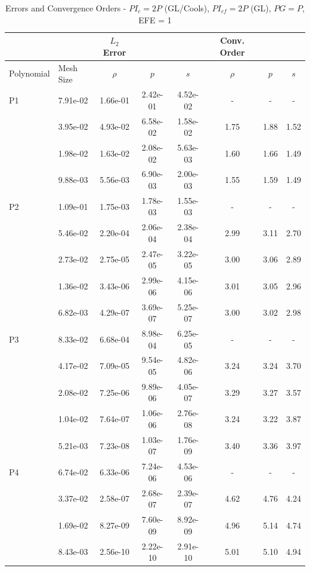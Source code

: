 \documentclass[12pt,Bold,letterpaper,TexShade]{mcgilletdclass}
\numberwithin{equation}{section}
\begin{document}
\begin {table}[!htbp]
\begin{center}
\caption{Errors and Convergence Orders - $PI_c  = 2P$ (GL/Cools), $PI_{cf} = 2P$ (GL), $PG = P$, EFE = 1}
\begin{tabular}{| l | l | c c c | c c c |}
	\hline
	 & & $L_2$ Error & & & Conv. Order & & \\
	\hline
	Polynomial & Mesh Size & $\rho$ & $p$     & $s$     & $\rho$ & $p$     & $s$     \\
	\hline
P1	& 7.91e-02 & 1.66e-01 & 2.42e-01 & 4.52e-02 & - & - & - \\
	& 3.95e-02 & 4.93e-02 & 6.58e-02 & 1.58e-02 & 1.75 & 1.88 & 1.52 \\
	& 1.98e-02 & 1.63e-02 & 2.08e-02 & 5.63e-03 & 1.60 & 1.66 & 1.49 \\
	& 9.88e-03 & 5.56e-03 & 6.90e-03 & 2.00e-03 & 1.55 & 1.59 & 1.49 \\
	\hline
P2	& 1.09e-01 & 1.75e-03 & 1.78e-03 & 1.55e-03 & - & - & - \\
	& 5.46e-02 & 2.20e-04 & 2.06e-04 & 2.38e-04 & 2.99 & 3.11 & 2.70 \\
	& 2.73e-02 & 2.75e-05 & 2.47e-05 & 3.22e-05 & 3.00 & 3.06 & 2.89 \\
	& 1.36e-02 & 3.43e-06 & 2.99e-06 & 4.15e-06 & 3.01 & 3.05 & 2.96 \\
	& 6.82e-03 & 4.29e-07 & 3.69e-07 & 5.25e-07 & 3.00 & 3.02 & 2.98 \\
	\hline
P3	& 8.33e-02 & 6.68e-04 & 8.98e-04 & 6.25e-05 & - & - & - \\
	& 4.17e-02 & 7.09e-05 & 9.54e-05 & 4.82e-06 & 3.24 & 3.24 & 3.70 \\
	& 2.08e-02 & 7.25e-06 & 9.89e-06 & 4.05e-07 & 3.29 & 3.27 & 3.57 \\
	& 1.04e-02 & 7.64e-07 & 1.06e-06 & 2.76e-08 & 3.24 & 3.22 & 3.87 \\
	& 5.21e-03 & 7.23e-08 & 1.03e-07 & 1.76e-09 & 3.40 & 3.36 & 3.97 \\
	\hline
P4	& 6.74e-02 & 6.33e-06 & 7.24e-06 & 4.53e-06 & - & - & - \\
	& 3.37e-02 & 2.58e-07 & 2.68e-07 & 2.39e-07 & 4.62 & 4.76 & 4.24 \\
	& 1.69e-02 & 8.27e-09 & 7.60e-09 & 8.92e-09 & 4.96 & 5.14 & 4.74 \\
	& 8.43e-03 & 2.56e-10 & 2.22e-10 & 2.91e-10 & 5.01 & 5.10 & 4.94 \\
	\hline
\end{tabular}
\label{tab:SM_PIc=2P(GL/Cools)_PIcf=2P(GL)_PG=P_EFE=1}
\end{center}
\end{table}
\end{document}
